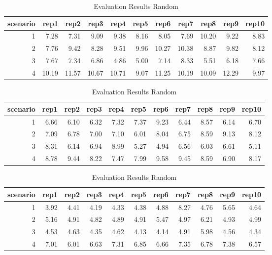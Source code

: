\begin{table}
	\centering
	\begin{tabular}{ rrrrrrrrrrr }
		\hline
		scenario & rep1 & rep2 & rep3 & rep4 & rep5 & rep6 & rep7 & rep8 & rep9 & rep10\\
		\hline
		1 & 7.28 & 7.31 & 9.09 & 9.38 & 8.16 & 8.05 & 7.69 & 10.20 & 9.22 & 8.83 \\ 
		2 & 7.76 & 9.42 & 8.28 & 9.51 & 9.96 & 10.27 & 10.38 & 8.87 & 9.82 & 8.12 \\ 
		3 & 7.67 & 7.34 & 6.86 & 4.86 & 5.00 & 7.14 & 8.33 & 5.51 & 6.18 & 7.66 \\ 
		4 & 10.19 & 11.57 & 10.67 & 10.71 & 9.07 & 11.25 & 10.19 & 10.09 & 12.29 & 9.97 \\ 
		\hline
	\end{tabular}
	\caption{Evaluation Results Optimized}
	\label{table:appendix:evaluation:optimized}
	\vspace{2em}
	\begin{tabular}{ rrrrrrrrrrr }
		\hline
		scenario & rep1 & rep2 & rep3 & rep4 & rep5 & rep6 & rep7 & rep8 & rep9 & rep10\\
		\hline
		1 & 6.66 & 6.10 & 6.32 & 7.32 & 7.37 & 9.23 & 6.44 & 8.57 & 6.14 & 6.70 \\
		2 & 7.09 & 6.78 & 7.00 & 7.10 & 6.01 & 8.04 & 6.75 & 8.59 & 9.13 & 8.12 \\ 
		3 & 8.31 & 6.14 & 6.94 & 8.99 & 5.27 & 4.94 & 6.56 & 6.03 & 6.61 & 5.11 \\ 
		4 & 8.78 & 9.44 & 8.22 & 7.47 & 7.99 & 9.58 & 9.45 & 8.59 & 6.90 & 8.17 \\ 
		\hline
	\end{tabular}

	\caption{Evaluation Results Default}
	\label{table:appendix:evaluation:default}
	\vspace{2em}
	\begin{tabular}{ rrrrrrrrrrr }
		\hline
		scenario & rep1 & rep2 & rep3 & rep4 & rep5 & rep6 & rep7 & rep8 & rep9 & rep10\\
		\hline
		1 & 3.92 & 4.41 & 4.19 & 4.33 & 4.38 & 4.88 & 8.27 & 4.76 & 5.65 & 4.64 \\ 
		2 & 5.16 & 4.91 & 4.82 & 4.89 & 4.91 & 5.47 & 4.97 & 6.21 & 4.93 & 4.99 \\ 
		3 & 4.53 & 4.63 & 4.35 & 4.62 & 4.13 & 4.14 & 4.91 & 5.98 & 4.56 & 4.34 \\ 
		4 & 7.01 & 6.01 & 6.63 & 7.31 & 6.85 & 6.66 & 7.35 & 6.78 & 7.38 & 6.57 \\
		\hline
	\end{tabular}
	\caption{Evaluation Results Random}
	\label{table:appendix:evaluation:random}
\end{table}





